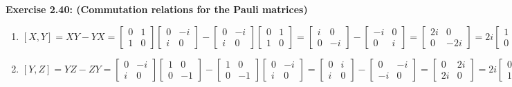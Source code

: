 \documentclass{article}
\begin{document}
\begin{framed}
    \noindent \textbf{Exercise 2.40: (Commutation relations for the Pauli matrices)}
    
    \medskip
    \begin{enumerate}
        \item $[X, Y] = XY - YX = \begin{bmatrix}0 & 1 \\ 1 & 0 \end{bmatrix}\begin{bmatrix}0 & -i \\ i & 0\end{bmatrix}-\begin{bmatrix}0 & -i \\ i & 0\end{bmatrix}\begin{bmatrix}0 & 1 \\ 1 & 0 \end{bmatrix} = \begin{bmatrix}i & 0 \\ 0 & -i \end{bmatrix}-\begin{bmatrix}-i & 0 \\ 0 & i \end{bmatrix}= \begin{bmatrix}2i & 0 \\ 0 & -2i \end{bmatrix} = 2i\begin{bmatrix}1 & 0 \\ 0 & -1\end{bmatrix} = 2iZ$
        \item $[Y, Z] = YZ - ZY = \begin{bmatrix}0 & -i \\ i & 0 \end{bmatrix}\begin{bmatrix}1 & 0 \\ 0 & -1\end{bmatrix} - \begin{bmatrix}1 & 0 \\ 0 & -1\end{bmatrix}\begin{bmatrix}0 & -i \\ i & 0 \end{bmatrix} = \begin{bmatrix}0 & i \\ i & 0\end{bmatrix} - \begin{bmatrix}0 & -i \\ -i & 0\end{bmatrix} = \begin{bmatrix}0 & 2i \\ 2i & 0\end{bmatrix} = 2i\begin{bmatrix}0 & 1 \\ 1 & 0\end{bmatrix} = 2iX$

\end{enumerate}
\end{framed}
\end{document}

